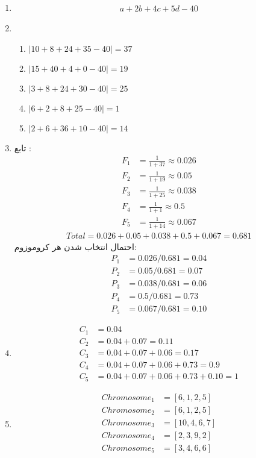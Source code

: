 \begin{enumerate}
    \item \begin{gather*}
        a + 2b + 4c + 5d - 40
    \end{gather*}
    \item \begin{enumerate}
        \item $|10 + 8 + 24 + 35 - 40| = 37$
        \item $|15 + 40 + 4 + 0 - 40| = 19$
        \item $|3 + 8 + 24 + 30 - 40| = 25$
        \item $|6 + 2 + 8 + 25 - 40| = 1$
        \item $|2 + 6 + 36 + 10 - 40| = 14$
    \end{enumerate}
    \item تابع :
    \begin{align*}
        F_1 &= \frac{1}{1+37} \approx 0.026 \\
        F_2 &= \frac{1}{1+19} \approx 0.05 \\
        F_3 &= \frac{1}{1+25} \approx 0.038 \\
        F_4 &= \frac{1}{1+1} \approx 0.5 \\
        F_5 &= \frac{1}{1+14} \approx 0.067
    \end{align*}
    \begin{gather*}
        Total = 0.026 + 0.05 + 0.038 + 0.5 + 0.067 = 0.681
    \end{gather*}
    احتمال انتخاب شدن هر کروموزوم:
    \begin{align*}
        P_1 &= 0.026 / 0.681 = 0.04 \\
        P_2 &= 0.05 / 0.681 = 0.07 \\
        P_3 &= 0.038 / 0.681 = 0.06 \\
        P_4 &= 0.5 / 0.681 = 0.73 \\
        P_5 &= 0.067 / 0.681 = 0.10
    \end{align*}
    \item \begin{align*}
        C_1 &= 0.04 \\
        C_2 &= 0.04 + 0.07 = 0.11 \\
        C_3 &= 0.04 + 0.07 + 0.06 = 0.17 \\
        C_4 &= 0.04 + 0.07 + 0.06 + 0.73 = 0.9 \\
        C_5 &= 0.04 + 0.07 + 0.06 + 0.73 + 0.10 = 1
    \end{align*}
    \item \begin{align*}
        Chromosome_1 &= [6, 1, 2, 5] \\
        Chromosome_2 &= [6, 1, 2, 5] \\
        Chromosome_3 &= [10, 4, 6, 7] \\
        Chromosome_4 &= [2, 3, 9, 2] \\
        Chromosome_5 &= [3, 4, 6, 6] \\
    \end{align*}
\end{enumerate}